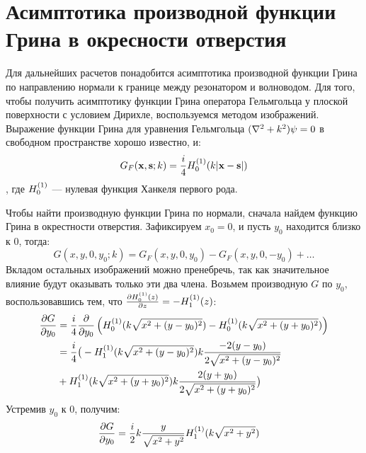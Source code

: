 \section{Асимптотика производной функции Грина в окресности отверстия}
Для дальнейших расчетов понадобится асимптотика производной функции Грина по направлению нормали к границе между резонатором и волноводом. Для того, чтобы получить асимптотику функции Грина оператора Гельмгольца у плоской поверхности с условием Дирихле, воспользуемся методом изображений. Выражение функции Грина для уравнения Гельмгольца $(\laplacian + k^2) \psi = 0$ в свободном пространстве хорошо известно, и:
\[
G_F(\vb{x}, \vb{s}; k) = \frac{i}{4} H_{0}^{(1)}(k |\vb{x} - \vb{s}|)
\],
где $H_{0}^{(1)}$ — нулевая функция Ханкеля первого рода\cite{hankel_first_kind}.

Чтобы найти производную функции Грина по нормали, сначала найдем функцию Грина в окрестности отверстия. Зафиксируем $x_0 = 0$, и пусть $y_0$ находится близко к $0$, тогда:
\[
G(x, y, 0, y_0; k) = G_F(x, y, 0, y_0) - G_F(x, y, 0, -y_0) + \dots
\]
Вкладом остальных изображений можно пренебречь, так как значительное влияние будут оказывать только эти два члена. Возьмем производную $G$ по $y_0$, воспользовавшись тем, что $\pdv{H_{0}^{(1)}(z)}{z} = - H_{1}^{(1)}(z)$:
\begin{align*}
\pdv{G}{y_0}
&= \frac{i}{4} \pdv{}{y_0} \left( H_{0}^{(1)}(k \sqrt{x^2 + (y - y_0)^2}) - H_{0}^{(1)}(k \sqrt{x^2 + (y + y_0)^2}) \right) \\
&= \frac{i}{4} \big( -H_{1}^{(1)}(k \sqrt{x^2 + (y - y_0)^2}) k \frac{-2 (y - y_0)}{2 \sqrt{x^2 + (y - y_0)^2}} \\
&+ H_{1}^{(1)}(k \sqrt{x^2 + (y + y_0)^2}) k \frac{2 (y + y_0)}{2 \sqrt{x^2 + (y + y_0)^2}} \big)
\end{align*}
Устремив $y_0$ к 0, получим:
\begin{align*}
\pdv{G}{y_0} (x, y, 0, 0; k)
&= \frac{i}{2} k \frac{y}{\sqrt{x^2 + y^2}} H_{1}^{(1)}(k \sqrt{x^2 + y^2})
\end{align*}

